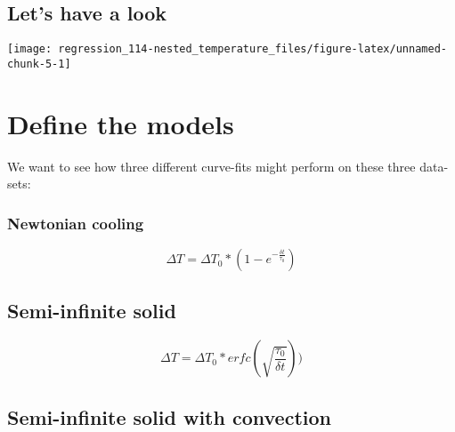 \documentclass[]{book}
\newenvironment{Shaded}{\begin{snugshade}}{\end{snugshade}}
\newcommand{\CommentTok}[1]{\textcolor[rgb]{0.56,0.35,0.01}{\textit{#1}}}
\newcommand{\DataTypeTok}[1]{\textcolor[rgb]{0.13,0.29,0.53}{#1}}
\newcommand{\KeywordTok}[1]{\textcolor[rgb]{0.13,0.29,0.53}{\textbf{#1}}}
\newcommand{\NormalTok}[1]{#1}
\newcommand{\OperatorTok}[1]{\textcolor[rgb]{0.81,0.36,0.00}{\textbf{#1}}}
\newcommand{\StringTok}[1]{\textcolor[rgb]{0.31,0.60,0.02}{#1}}
\begin{document}
\hypertarget{lets-have-a-look}{%
\subsection{Let's have a look}\label{lets-have-a-look}}

\begin{Shaded}
\end{Shaded}

\begin{center}\texttt{[image: regression\_114-nested\_temperature\_files/figure-latex/unnamed-chunk-5-1]} \end{center}

\hypertarget{define-the-models}{%
\section{Define the models}\label{define-the-models}}

We want to see how three different curve-fits might perform on these three data-sets:

\hypertarget{newtonian-cooling}{%
\subsubsection{Newtonian cooling}\label{newtonian-cooling}}

\[\Delta T = \Delta {T_0} * (1 - e^{-\frac{\delta t}{\tau_0}})\]

\hypertarget{semi-infinite-solid}{%
\subsection{Semi-infinite solid}\label{semi-infinite-solid}}

\[\Delta T = \Delta T_0 * erfc(\sqrt{\frac{\tau_0}{\delta t}}))\]

\hypertarget{semi-infinite-solid-with-convection}{%
\subsection{Semi-infinite solid with convection}\label{semi-infinite-solid-with-convection}}
\end{document}
